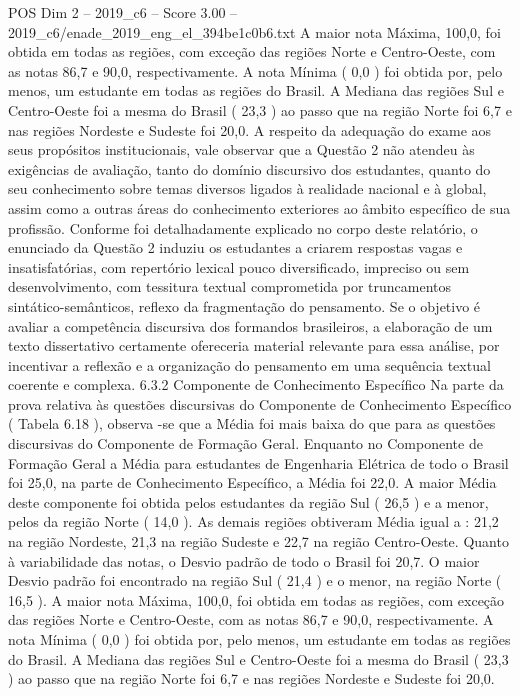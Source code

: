 \begin{textsample}{POS Dim 2 – 2019\_c6 – Score 3.00 – 2019\_c6/enade\_2019\_eng\_el\_394be1c0b6.txt}
A maior nota Máxima, 100,0, foi obtida em todas as regiões, com exceção das regiões Norte e Centro-Oeste, com as notas 86,7 e 90,0, respectivamente.
A nota Mínima ( 0,0 ) foi obtida por, pelo menos, um estudante em todas as regiões do Brasil.
A Mediana das regiões Sul e Centro-Oeste foi a mesma do Brasil ( 23,3 ) ao passo que na região Norte foi 6,7 e nas regiões Nordeste e Sudeste foi 20,0.
A respeito da adequação do exame aos seus propósitos institucionais, vale observar que a Questão 2 não atendeu às exigências de avaliação, tanto do domínio discursivo dos estudantes, quanto do seu conhecimento sobre temas diversos ligados à realidade nacional e à global, assim como a outras áreas do conhecimento exteriores ao âmbito específico de sua profissão.
Conforme foi detalhadamente explicado no corpo deste relatório, o enunciado da Questão 2 induziu os estudantes a criarem respostas vagas e insatisfatórias, com repertório lexical pouco diversificado, impreciso ou sem desenvolvimento, com tessitura textual comprometida por truncamentos sintático-semânticos, reflexo da fragmentação do pensamento.
Se o objetivo é avaliar a competência discursiva dos formandos brasileiros, a elaboração de um texto dissertativo certamente ofereceria material relevante para essa análise, por incentivar a reflexão e a organização do pensamento em uma sequência textual coerente e complexa. 6.3.2 Componente de Conhecimento Específico Na parte da prova relativa às questões discursivas do Componente de Conhecimento Específico ( Tabela 6.18 ), observa -se que a Média foi mais baixa do que para as questões discursivas do Componente de Formação Geral.
Enquanto no Componente de Formação Geral a Média para estudantes de Engenharia Elétrica de todo o Brasil foi 25,0, na parte de Conhecimento Específico, a Média foi 22,0.
A maior Média deste componente foi obtida pelos estudantes da região Sul ( 26,5 ) e a menor, pelos da região Norte ( 14,0 ).
As demais regiões obtiveram Média igual a : 21,2 na região Nordeste, 21,3 na região Sudeste e 22,7 na região Centro-Oeste.
Quanto à variabilidade das notas, o Desvio padrão de todo o Brasil foi 20,7.
O maior Desvio padrão foi encontrado na região Sul ( 21,4 ) e o menor, na região Norte ( 16,5 ).
A maior nota Máxima, 100,0, foi obtida em todas as regiões, com exceção das regiões Norte e Centro-Oeste, com as notas 86,7 e 90,0, respectivamente.
A nota Mínima ( 0,0 ) foi obtida por, pelo menos, um estudante em todas as regiões do Brasil.
A Mediana das regiões Sul e Centro-Oeste foi a mesma do Brasil ( 23,3 ) ao passo que na região Norte foi 6,7 e nas regiões Nordeste e Sudeste foi 20,0.

\end{textsample}
